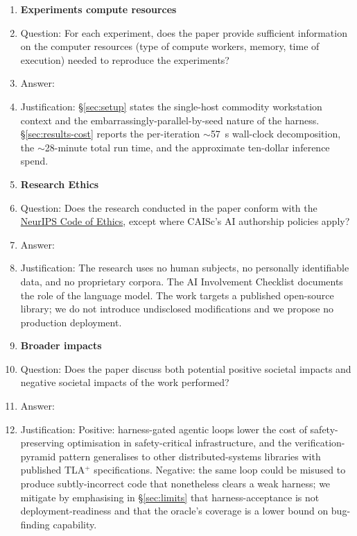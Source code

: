 \documentclass{article}
\begin{document}
\begin{enumerate}
\item {\bf Experiments compute resources}
    \item[] Question: For each experiment, does the paper provide sufficient information on the computer resources (type of compute workers, memory, time of execution) needed to reproduce the experiments?
    \item[] Answer: \answerYes{}
    \item[] Justification: \S\ref{sec:setup} states the single-host commodity workstation context and the embarrassingly-parallel-by-seed nature of the harness. \S\ref{sec:results-cost} reports the per-iteration $\sim$57~s wall-clock decomposition, the $\sim$28-minute total run time, and the approximate ten-dollar inference spend.

\item {\bf Research Ethics}
    \item[] Question: Does the research conducted in the paper conform with the \href{https://neurips.cc/Conferences/2026/MainTrackHandbook}{NeurIPS Code of Ethics}, except where CAISc's AI authorship policies apply?
    \item[] Answer: \answerYes{}
    \item[] Justification: The research uses no human subjects, no personally identifiable data, and no proprietary corpora. The AI Involvement Checklist documents the role of the language model. The work targets a published open-source library; we do not introduce undisclosed modifications and we propose no production deployment.

\item {\bf Broader impacts}
    \item[] Question: Does the paper discuss both potential positive societal impacts and negative societal impacts of the work performed?
    \item[] Answer: \answerYes{}
    \item[] Justification: Positive: harness-gated agentic loops lower the cost of safety-preserving optimisation in safety-critical infrastructure, and the verification-pyramid pattern generalises to other distributed-systems libraries with published TLA$^{+}$ specifications. Negative: the same loop could be misused to produce subtly-incorrect code that nonetheless clears a weak harness; we mitigate by emphasising in \S\ref{sec:limits} that harness-acceptance is not deployment-readiness and that the oracle's coverage is a lower bound on bug-finding capability.

\end{enumerate}
\end{document}
